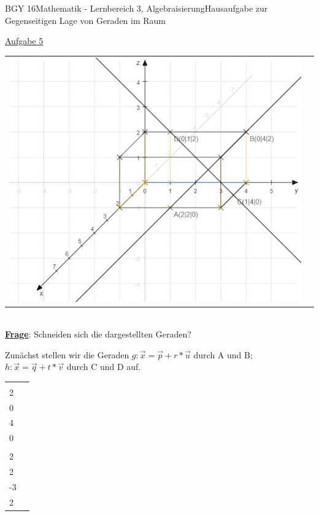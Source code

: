 \documentclass[oneside,openany,headings=optiontotoc,11pt,numbers=noenddot]{scrreprt}
\begin{document}
\begin{worksheet}{BGY 16}{Mathematik - Lernbereich 3, Algebraisierung}{Hausaufgabe zur Gegenseitigen Lage von Geraden im Raum}
\begin{framed}
			\underline{Aufgabe 5}\\
			\begin{tabularx}{\textwidth}{lX}
			\includegraphics[scale=0.5]{Bilder/S65N9.jpg}
			\end{tabularx}\\
			\underline{\textbf{Frage}}: Schneiden sich die dargestellten Geraden?
			\par\noindent
			Zunächst stellen wir die Geraden \(g: \vec{x} = \vec{p} + r*\vec{u}\) durch A und B; \(h: \vec{x} = \vec{q} + t*\vec{v}\) durch C und D auf.\\
			\par\noindent
			\begin{tabularx}{\textwidth}{X|X}
				\(\vec{p} = \left(\begin{array}{c}2\\2\\0\end{array}\right)\) & \(\vec{p} = \left(\begin{array}{c}1\\4\\0\end{array}\right)\)\\
				\(\vec{u} = \vec{B} - \vec{A} =  \left(\begin{array}{c}-2\\2\\2\end{array}\right)\) & \(\vec{v} = \vec{D} - \vec{C} =  \left(\begin{array}{c}-1\\-3\\2\end{array}\right)\)\\

\end{tabularx}
\end{framed}
\end{worksheet}
\end{document}
